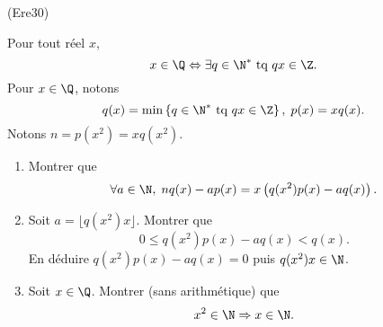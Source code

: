 \begin{tiny}(Ere30)\end{tiny} Pour tout réel $x$,
\[
  x\in\Q \Leftrightarrow \exists q \in \N^* \text{ tq } qx \in \Z.
\]
Pour $x\in \Q$, notons
\[
  q(x)= \min\left\lbrace q \in \N^* \text{ tq } qx \in \Z\right\rbrace, \;
  p(x) = xq(x).
\]
Notons $n = p(x^2) = xq(x^2)$.
\begin{enumerate}
  \item Montrer que
\[
\forall a \in \N,\;
nq(x) - ap(x) = x \left( q(x^2)p(x) - aq(x)\right).
\]
  \item Soit $a = \lfloor q(x^2)x \rfloor$. Montrer que
\[
  0 \leq q(x^2)p(x) - aq(x) < q(x).
\]
En déduire $q(x^2)p(x) - aq(x) = 0$ puis $q(x^2)x \in \N$.
  \item Soit $x\in \Q$. Montrer (sans arithmétique) que
\[
  x^2 \in \N \Rightarrow x \in \N.
\]
\end{enumerate}
